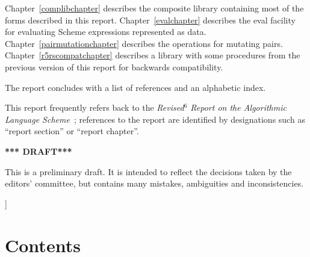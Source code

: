 \documentclass[twoside,twocolumn]{algol60}
\begin{document}
{Chapter~\ref{complibchapter} describes the composite library
containing most of the forms described in this report.
Chapter~\ref{evalchapter} describes the {\cf eval} facility for
evaluating Scheme expressions represented as data.
Chapter~\ref{pairmutationchapter} describes the operations for
mutating pairs.  Chapter~\ref{r5rscompatchapter} describes a library
with some procedures from the previous
version of this report for backwards compatibility.

The report concludes with a list of references and an
alphabetic index.

This report frequently refers back to the \textit{Revised$^6$ Report
  on the Algorithmic Language Scheme}~\cite{R6RS}; references to the
report are identified by designations such as ``report section'' or
``report chapter''.

\bigskip

\begin{center}
{\large \bf
*** DRAFT*** \\
}\end{center}

This is a preliminary draft.  It is intended to reflect the decisions
taken by the editors' committee, but contains many mistakes,
ambiguities and inconsistencies.

}]

\texonly\clearpage\endtexonly

\chapter*{Contents}
\addvspace{3.5pt}                  %
\renewcommand{\tocshrink}{-4.0pt}  %
{%
\tableofcontents
}

\vfill

\texonly\clearpage\endtexonly

 \par
 \par
    \par
    \par
 \par
     \par
      \par
   \par
   \par
 \par
 \par
    \par
 \par
 \par
    \par
  \par
 \par
 \par
\renewcommand{\bibname}{References}




\vfill\eject


\newcommand{\indexheading}{Alphabetic index of definitions of
  concepts, keywords, and procedures}
\newcommand{\indexintro}{}

\printindex
\end{document}
